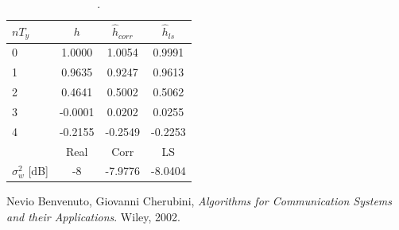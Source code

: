 \documentclass[a4paper,11.5pt]{article}
\begin{document}
\begin{table}[htbp]
	\begin{center}
		\begin{tabular}{p{2.7cm}ccc}
			\toprule
			
			$nT_y$ & $h$ & $\hat{h}_{corr}$ & $\hat{h}_{ls}$\\
			\midrule
			0 & 1.0000  & 1.0054 & 0.9991  \\
			1 & 0.9635 & 0.9247 & 0.9613  \\
			2 & 0.4641 & 0.5002 & 0.5062 \\
			3 & -0.0001 & 0.0202 & 0.0255  \\
			4 & -0.2155 & -0.2549 & -0.2253\\
			\midrule
			& Real & Corr & LS \\
		    \cmidrule(lr){2-4}
		    $\sigma_w^2$ [dB] & -8 & -7.9776 & -8.0404  \\
			\bottomrule
		\end{tabular}
	\end{center}
	\label{tab:}
	\caption{.}
\end{table} 
 




\begin{thebibliography}{15}
	
	Nevio Benvenuto, Giovanni Cherubini,
	\textit{Algorithms for Communication Systems and their Applications}. 
	Wiley, 2002.
	

	
\end{thebibliography}
\end{document}
